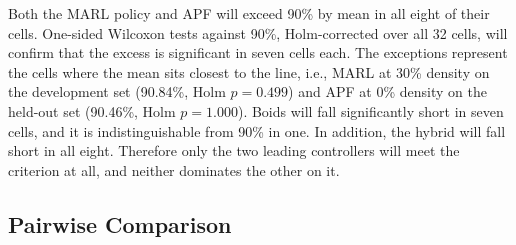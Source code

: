 \documentclass[a4paper, 10pt, conference]{ieeeconf}
\begin{document}
Both the MARL policy and APF will exceed 90\% by mean in all eight of
their cells. One-sided Wilcoxon tests against 90\%, Holm-corrected
over all 32 cells, will confirm that the excess is significant in
seven cells each. The exceptions represent the cells where the mean
sits closest to the line, i.e., MARL at 30\% density on the
development set (90.84\%, Holm $p = 0.499$) and APF at 0\% density on
the held-out set (90.46\%, Holm $p = 1.000$). Boids will fall
significantly short in seven cells, and it is indistinguishable from
90\% in one. In addition, the hybrid will fall short in all eight.
Therefore only the two leading controllers will meet the criterion at
all, and neither dominates the other on it.

\subsection{Pairwise Comparison}\label{sec:pairwise}
\end{document}
